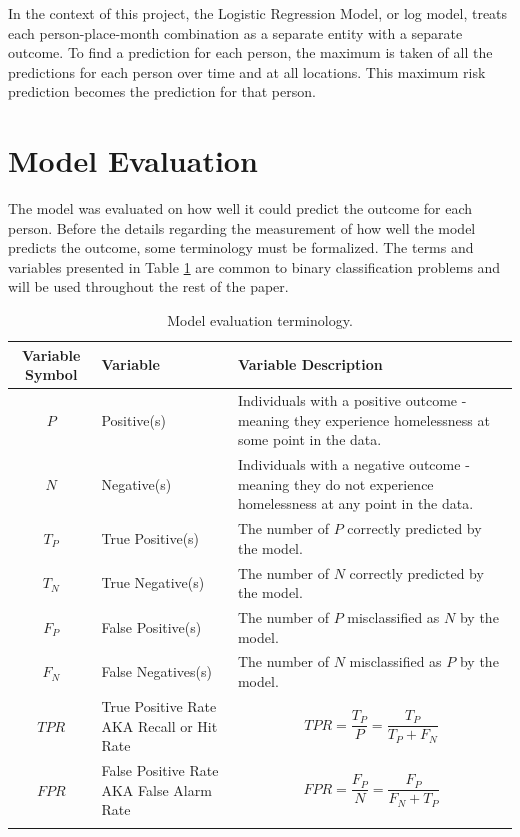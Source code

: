 \documentclass[12pt]{report}
\begin{document}
In the context of this project, the Logistic Regression Model, or log model, treats each person-place-month combination as a separate entity with a separate outcome. To find a prediction for each person, the maximum is taken of all the predictions for each person over time and at all locations. This maximum risk prediction becomes the prediction for that person.

\section{Model Evaluation}
The model was evaluated on how well it could predict the outcome for each person. Before the details regarding the measurement of how well the model predicts the outcome, some terminology must be formalized. The terms and variables presented in Table \ref{tbl:evalTerminology} are common to binary classification problems and will be used throughout the rest of the paper.

\begin{longtable}{c|p{4cm}|p{7cm}}
    \toprule
    Variable Symbol & Variable & Variable Description \\
    \midrule
    $P$ & Positive(s) & Individuals with a positive outcome - meaning they experience homelessness at some point in the data. \\
    \hline
    $N$ & Negative(s) & Individuals with a negative outcome - meaning they do not experience homelessness at any point in the data. \\
    \hline
    $T_P$ & True Positive(s) & The number of $P$ correctly predicted by the model. \\
    \hline
    $T_N$ & True Negative(s) & The number of $N$ correctly predicted by the model. \\
    \hline
    $F_P$ & False Positive(s) & The number of $P$ misclassified as $N$ by the model. \\
    \hline
    $F_N$ & False Negatives(s) & The number of $N$ misclassified as $P$ by the model. \\
    \hline
    $TPR$ & True Positive Rate AKA Recall or Hit Rate & $$TPR = \frac{T_P}{P} = \frac{T_P}{T_P + F_N}$$ \\
    \hline
    $FPR$ & False Positive Rate AKA False Alarm Rate & $$FPR = \frac{F_P}{N} = \frac{F_P}{F_N + T_P}$$ \\
    \bottomrule
    \caption{Model evaluation terminology.}
    \label{tbl:evalTerminology}
\end{longtable}
\end{document}
